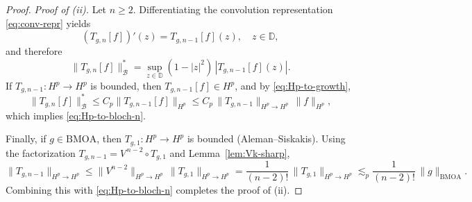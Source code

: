 \documentclass[preprint,12pt]{elsarticle}
\numberwithin{equation}{section}
\theoremstyle{remark}
\begin{document}
\begin{proof}
\medskip
\noindent\textit{Proof of (ii).}
Let $n\ge2$. Differentiating the convolution representation \eqref{eq:conv-repr} yields
\begin{equation}\label{eq:Tgn-derivative}
(T_{g,n}[f])'(z)=T_{g,n-1}[f](z),\quad z\in\mathbb D,
\end{equation}
and therefore
\begin{equation*}
\|T_{g,n}[f]\|_{\mathcal B}^*
=\sup_{z\in\mathbb D}(1-|z|^2)\,|T_{g,n-1}[f](z)|.
\end{equation*}
If $T_{g,n-1}:H^p\to H^p$ is bounded, then $T_{g,n-1}[f]\in H^p$, and by \eqref{eq:Hp-to-growth},
\begin{equation*}
\|T_{g,n}[f]\|_{\mathcal B}^*
\le C_p\|T_{g,n-1}[f]\|_{H^p}
\le C_p\,\|T_{g,n-1}\|_{H^p\to H^p}\,\|f\|_{H^p},
\end{equation*}
which implies \eqref{eq:Hp-to-bloch-n}.

Finally, if $g\in\mathrm{BMOA}$, then $T_{g,1}:H^p\to H^p$ is bounded (Aleman--Siskakis). Using the factorization
$T_{g,n-1}=V^{\,n-2}\circ T_{g,1}$ and Lemma~\ref{lem:Vk-sharp},
\begin{equation*}
\|T_{g,n-1}\|_{H^p\to H^p}
\le \|V^{n-2}\|_{H^p\to H^p}\,\|T_{g,1}\|_{H^p\to H^p}
=\frac{1}{(n-2)!}\,\|T_{g,1}\|_{H^p\to H^p}
\lesssim_p \frac{1}{(n-2)!}\,\|g\|_{\mathrm{BMOA}}.
\end{equation*}
Combining this with \eqref{eq:Hp-to-bloch-n} completes the proof of (ii).
\end{proof}
\end{document}
